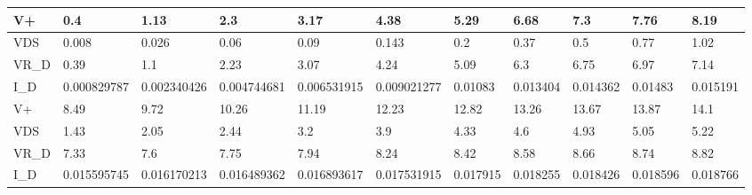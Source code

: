 \begin{table}[h]
{\begin{tabular}{|lllllllllll|}
\multicolumn{1}{|l|}{V+}    & \multicolumn{1}{l|}{0.4}         & \multicolumn{1}{l|}{1.13}        & \multicolumn{1}{l|}{2.3}         & \multicolumn{1}{l|}{3.17}        & \multicolumn{1}{l|}{4.38}        & \multicolumn{1}{l|}{5.29}     & \multicolumn{1}{l|}{6.68}     & \multicolumn{1}{l|}{7.3}      & \multicolumn{1}{l|}{7.76}     & 8.19     \\ \hline
\multicolumn{1}{|l|}{VDS}   & \multicolumn{1}{l|}{0.008}       & \multicolumn{1}{l|}{0.026}       & \multicolumn{1}{l|}{0.06}        & \multicolumn{1}{l|}{0.09}        & \multicolumn{1}{l|}{0.143}       & \multicolumn{1}{l|}{0.2}      & \multicolumn{1}{l|}{0.37}     & \multicolumn{1}{l|}{0.5}      & \multicolumn{1}{l|}{0.77}     & 1.02     \\ \hline
\multicolumn{1}{|l|}{VR\_D} & \multicolumn{1}{l|}{0.39}        & \multicolumn{1}{l|}{1.1}         & \multicolumn{1}{l|}{2.23}        & \multicolumn{1}{l|}{3.07}        & \multicolumn{1}{l|}{4.24}        & \multicolumn{1}{l|}{5.09}     & \multicolumn{1}{l|}{6.3}      & \multicolumn{1}{l|}{6.75}     & \multicolumn{1}{l|}{6.97}     & 7.14     \\ \hline
\multicolumn{1}{|l|}{I\_D}  & \multicolumn{1}{l|}{0.000829787} & \multicolumn{1}{l|}{0.002340426} & \multicolumn{1}{l|}{0.004744681} & \multicolumn{1}{l|}{0.006531915} & \multicolumn{1}{l|}{0.009021277} & \multicolumn{1}{l|}{0.01083}  & \multicolumn{1}{l|}{0.013404} & \multicolumn{1}{l|}{0.014362} & \multicolumn{1}{l|}{0.01483}  & 0.015191 \\ \hline
\multicolumn{1}{|l|}{V+}    & \multicolumn{1}{l|}{8.49}        & \multicolumn{1}{l|}{9.72}        & \multicolumn{1}{l|}{10.26}       & \multicolumn{1}{l|}{11.19}       & \multicolumn{1}{l|}{12.23}       & \multicolumn{1}{l|}{12.82}    & \multicolumn{1}{l|}{13.26}    & \multicolumn{1}{l|}{13.67}    & \multicolumn{1}{l|}{13.87}    & 14.1     \\ \hline
\multicolumn{1}{|l|}{VDS}   & \multicolumn{1}{l|}{1.43}        & \multicolumn{1}{l|}{2.05}        & \multicolumn{1}{l|}{2.44}        & \multicolumn{1}{l|}{3.2}         & \multicolumn{1}{l|}{3.9}         & \multicolumn{1}{l|}{4.33}     & \multicolumn{1}{l|}{4.6}      & \multicolumn{1}{l|}{4.93}     & \multicolumn{1}{l|}{5.05}     & 5.22     \\ \hline
\multicolumn{1}{|l|}{VR\_D} & \multicolumn{1}{l|}{7.33}        & \multicolumn{1}{l|}{7.6}         & \multicolumn{1}{l|}{7.75}        & \multicolumn{1}{l|}{7.94}        & \multicolumn{1}{l|}{8.24}        & \multicolumn{1}{l|}{8.42}     & \multicolumn{1}{l|}{8.58}     & \multicolumn{1}{l|}{8.66}     & \multicolumn{1}{l|}{8.74}     & 8.82     \\ \hline
\multicolumn{1}{|l|}{I\_D}  & \multicolumn{1}{l|}{0.015595745} & \multicolumn{1}{l|}{0.016170213} & \multicolumn{1}{l|}{0.016489362} & \multicolumn{1}{l|}{0.016893617} & \multicolumn{1}{l|}{0.017531915} & \multicolumn{1}{l|}{0.017915} & \multicolumn{1}{l|}{0.018255} & \multicolumn{1}{l|}{0.018426} & \multicolumn{1}{l|}{0.018596} & 0.018766 \\ \hline
\end{tabular}%
}
\end{table}
